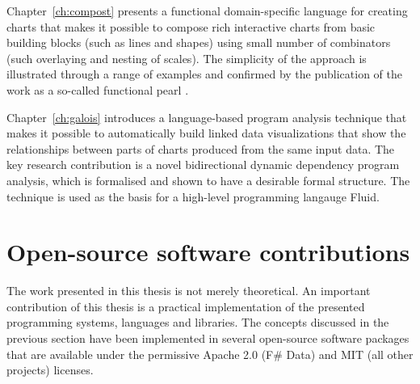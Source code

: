 \documentclass[fleqn,11pt]{report}
\theoremstyle{definition}
\begin{document}
Chapter~\ref{ch:compost} presents a functional domain-specific language for creating charts that
makes it possible to compose rich interactive charts from basic building blocks (such as lines
and shapes) using small number of combinators (such overlaying and nesting of scales).
The simplicity of the approach is illustrated through a range of examples and confirmed by the
publication of the work as a so-called functional pearl \citep{gibbons-2010-pearl}.

Chapter~\ref{ch:galois} introduces a language-based program analysis technique that makes it
possible to automatically build linked data visualizations that show the relationships between parts
of charts produced from the same input data. The key research contribution is a novel bidirectional
dynamic dependency program analysis, which is formalised and shown to have a desirable formal
structure. The technique is used as the basis for a high-level programming langauge Fluid.

\section{Open-source software contributions}

The work presented in this thesis is not merely theoretical. An important contribution
of this thesis is a practical implementation of the presented programming systems, languages
and libraries. The concepts discussed in the previous section have been implemented in
several open-source software packages that are available under the permissive Apache 2.0 (F\# Data)
and MIT (all other projects) licenses.
\end{document}
